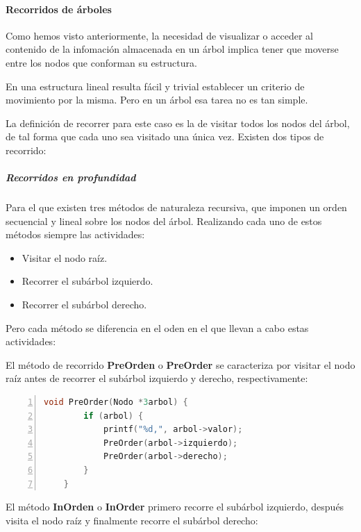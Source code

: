 \documentclass[a4paper, 11pt, titlepage]{article}
\begin{document}
            \paragraph{Recorridos de árboles} Como hemos visto anteriormente, la necesidad de 
            visualizar o acceder al contenido de la infomación almacenada en un árbol implica tener 
            que moverse entre los nodos que conforman su estructura.

            En una estructura lineal resulta fácil y trivial establecer un criterio de movimiento 
            por la misma. Pero en un árbol esa tarea no es tan simple.

            La definición de recorrer para este caso es la de visitar todos los nodos del árbol, de tal 
            forma que cada uno sea visitado una única vez. Existen dos tipos de recorrido:

            \subparagraph{Recorridos en profundidad} Para el que existen tres métodos de naturaleza 
            recursiva, que imponen un orden secuencial y lineal sobre los nodos del árbol. Realizando 
            cada uno de estos métodos siempre las actividades:

            \begin{itemize}
                \item Visitar el nodo raíz.
                \item Recorrer el subárbol izquierdo.
                \item Recorrer el subárbol derecho.
            \end{itemize}

            Pero cada método se diferencia en el oden en el que llevan a cabo estas actividades:

            El método de recorrido \textbf{PreOrden} o \textbf{PreOrder} se caracteriza por visitar el 
            nodo raíz antes de recorrer el subárbol izquierdo y derecho, respectivamente:

            \begin{lstlisting}[language=C,numbers=left]
    void PreOrder(Nodo *3arbol) {
        if (arbol) {
            printf("%d,", arbol->valor);
            PreOrder(arbol->izquierdo);
            PreOrder(arbol->derecho);
        }
    }\end{lstlisting}

            El método \textbf{InOrden} o \textbf{InOrder} primero recorre el subárbol izquierdo, después 
            visita el nodo raíz y finalmente recorre el subárbol derecho:
\end{document}
